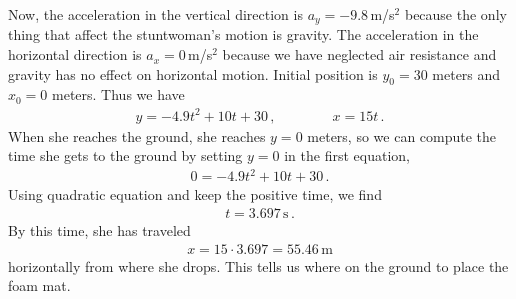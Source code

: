 \documentclass[11pt]{article}
\begin{document}
\noindent{}

\hfill\break

Now, the acceleration in the vertical direction is $a_y = -9.8$\,m/s$^2$ because the only thing that affect the stuntwoman's motion is gravity. The acceleration in the horizontal direction is $a_x = 0$\,m/s$^2$ because we have neglected air resistance and gravity has no effect on horizontal motion. Initial position is $y_0 = 30$ meters and $x_0 = 0$ meters. Thus we have
\begin{align*}
y = -4.9 t^2 + 10 t + 30\,,\qquad\qquad
x = 15 t \,.
\end{align*}
When she reaches the ground, she reaches $y=0$ meters, so we can compute the time she gets to the ground by setting $y =0$ in the first equation, 
\begin{align*}
0  =-4.9 t^2 + 10 t + 30\,.
\end{align*}
Using quadratic equation and keep the positive time, we find
\begin{align*}
t = 3.697\,\text{s}\,.
\end{align*}
By this time, she has traveled
\begin{align*}
x = 15 \cdot 3.697 = 55.46\,\text{m}
\end{align*}
horizontally from where she drops. This tells us where on the ground to place the foam mat.\\
\end{document}
